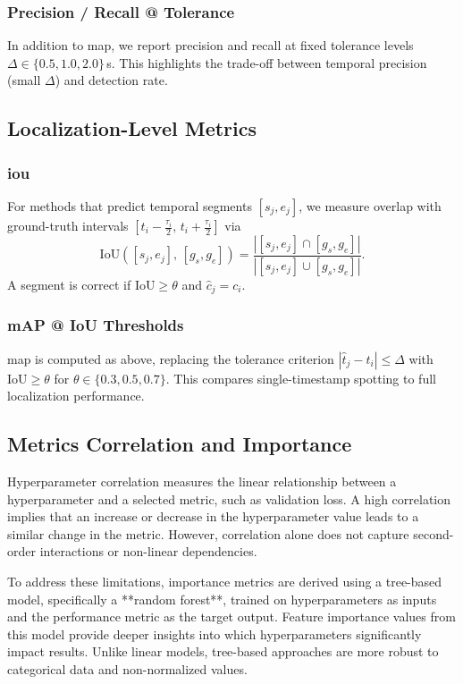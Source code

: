 \subsubsection{Precision / Recall @ Tolerance}
In addition to \acrshort{map}, we report precision and recall at fixed tolerance levels $\Delta\in\{0.5,1.0,2.0\}$\,s. This highlights the trade-off between temporal precision (small $\Delta$) and detection rate.

\subsection{Localization-Level Metrics}
\subsubsection{\acrfull{iou}}
For methods that predict temporal segments $[s_j,e_j]$, we measure overlap with ground-truth intervals $[t_i-\tfrac{\tau_i}{2},\,t_i+\tfrac{\tau_i}{2}]$ via
\[
\mathrm{IoU}([s_j,e_j],\,[g_s,g_e]) 
= \frac{|[s_j,e_j]\cap [g_s,g_e]|}{|[s_j,e_j]\cup [g_s,g_e]|}.
\]
A segment is correct if $\mathrm{IoU}\!\ge\theta$ and $\hat c_j=c_i$.

\subsubsection{mAP @ IoU Thresholds}
\acrshort{map} is computed as above, replacing the tolerance criterion $|\hat t_j - t_i|\le\Delta$ with $\mathrm{IoU}\ge\theta$ for $\theta\in\{0.3,0.5,0.7\}$. This compares single-timestamp spotting to full localization performance.


\subsection{Metrics Correlation and Importance}

Hyperparameter correlation measures the linear relationship between a hyperparameter and a selected metric, such as validation loss. A high correlation implies that an increase or decrease in the hyperparameter value leads to a similar change in the metric. However, correlation alone does not capture second-order interactions or non-linear dependencies.

To address these limitations, importance metrics are derived using a tree-based model, specifically a **random forest**, trained on hyperparameters as inputs and the performance metric as the target output. Feature importance values from this model provide deeper insights into which hyperparameters significantly impact results. Unlike linear models, tree-based approaches are more robust to categorical data and non-normalized values.

